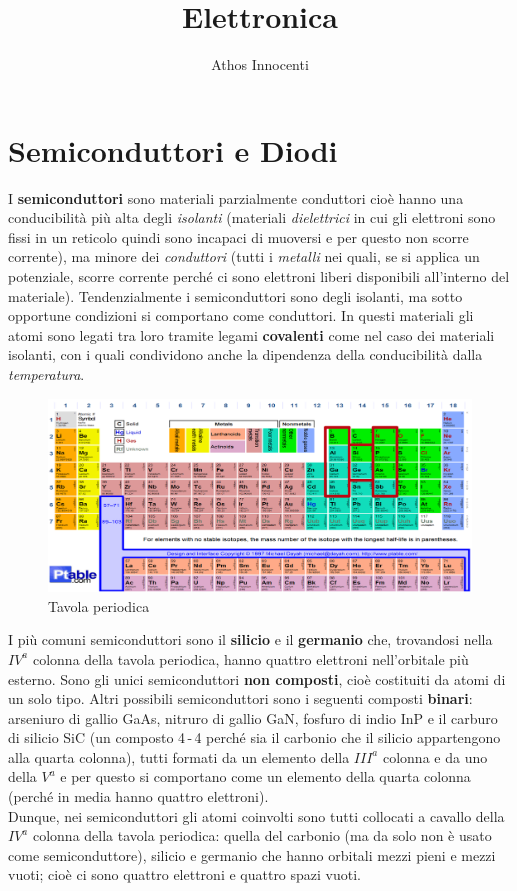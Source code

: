 \documentclass[12pt, a4paper]{report}
\author{Athos Innocenti}
\title{\Huge Elettronica}\date{}\author{}
\begin{document}
\maketitle
\tableofcontents

\chapter{Semiconduttori e Diodi}
I \textbf{semiconduttori} sono materiali parzialmente conduttori cioè hanno una conducibilità più alta degli \textit{isolanti} (materiali \textit{dielettrici} in cui gli elettroni sono fissi in un reticolo quindi sono incapaci di muoversi e per questo non scorre corrente), ma minore dei \textit{conduttori} (tutti i \textit{metalli} nei quali, se si applica un potenziale, scorre corrente perché ci sono elettroni liberi disponibili all'interno del materiale). Tendenzialmente i semiconduttori sono degli isolanti, ma sotto opportune condizioni si comportano come conduttori. In questi materiali gli atomi sono legati tra loro tramite legami \textbf{covalenti} come nel caso dei materiali isolanti, con i quali condividono anche la dipendenza della conducibilità dalla \textit{temperatura}.
\begin{figure}[h]
\centering
\includegraphics[scale=0.4,angle=0]{tavola_periodica.png}
\caption{Tavola periodica}
\end{figure}

I più comuni semiconduttori sono il \textbf{silicio} e il \textbf{germanio} che, trovandosi nella $IV^{a}$ colonna della tavola periodica, hanno quattro elettroni nell'orbitale più esterno. Sono gli unici semiconduttori \textbf{non composti}, cioè costituiti da atomi di un solo tipo. Altri possibili semiconduttori sono i seguenti composti \textbf{binari}: arseniuro di gallio GaAs, nitruro di gallio GaN, fosfuro di indio InP e il carburo di silicio SiC (un composto 4\,-\,4 perché sia il carbonio che il silicio appartengono alla quarta colonna), tutti formati da un elemento della $III^{a}$ colonna e da uno della $V^{a}$ e per questo si comportano come un elemento della quarta colonna (perché in media hanno quattro elettroni).\\Dunque, nei semiconduttori gli atomi coinvolti sono tutti collocati a cavallo della $IV^{a}$ colonna della tavola periodica: quella del carbonio (ma da solo non è usato come semiconduttore), silicio e germanio che hanno orbitali mezzi pieni e mezzi vuoti; cioè ci sono quattro elettroni e quattro spazi vuoti.
\end{document}
